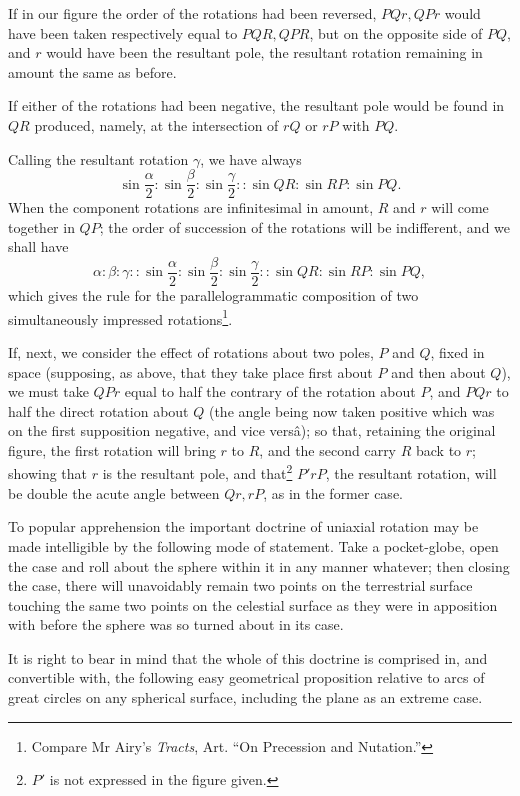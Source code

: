 \documentclass[11pt]{article}
\newcommand{\sourcepage}[1]{\marginpar{\scriptsize p.~#1}}
\begin{document}
{{If in our figure the order of the rotations had been reversed, $PQr,QPr$ would have been taken respectively equal to $PQR,QPR$, but on the opposite side of $PQ$, and $r$ would have been the resultant pole, the resultant rotation remaining in amount the same as before.

If either of the rotations had been negative, the resultant pole would be found in $QR$ produced, namely, at the intersection of $rQ$ or $rP$ with $PQ$.

Calling the resultant rotation $\gamma$, we have always
\[
 \sin\frac{\alpha}{2}:\sin\frac{\beta}{2}:\sin\frac{\gamma}{2}
 ::\sin QR:\sin RP:\sin PQ.
\]
When the component rotations are infinitesimal in amount, $R$ and $r$ will come together in $QP$; the order of succession of the rotations will be indifferent, and we shall have
\[
 \alpha:\beta:\gamma::\sin\frac{\alpha}{2}:\sin\frac{\beta}{2}:\sin\frac{\gamma}{2}
 ::\sin QR:\sin RP:\sin PQ,
\]
which gives the rule for the parallelogrammatic composition of two simultaneously impressed rotations\footnote{Compare Mr Airy's \emph{Tracts}, Art. ``On Precession and Nutation.''}.

If, next, we consider the effect of rotations about two poles, $P$ and $Q$, fixed in space (supposing, as above, that they take place first about $P$ and then about $Q$), we must take $QPr$ equal to half the contrary of the rotation about $P$, and $PQr$ to half the direct rotation about $Q$ (the angle being now taken positive which was on the first supposition negative, and vice vers\^a); so that, retaining the original figure, the first rotation will bring $r$ to $R$, and the second carry $R$ back to $r$; showing that $r$ is the resultant pole, and that\footnote{$P'$ is not expressed in the figure given.} $P'rP$, the resultant rotation, will be double the acute angle between $Qr,rP$, as in the former case.

To popular apprehension the important doctrine of uniaxial rotation may be made intelligible by the following mode of statement. Take a pocket-globe, open the case and roll about the sphere within it in any manner whatever; then closing the case, there will unavoidably remain two points on the terrestrial surface touching the same two points on the celestial surface as they were in apposition with before the sphere was so turned about in its case.

\sourcepage{160}
It is right to bear in mind that the whole of this doctrine is comprised in, and convertible with, the following easy geometrical proposition relative to arcs of great circles on any spherical surface, including the plane as an extreme case.

}}
\end{document}
